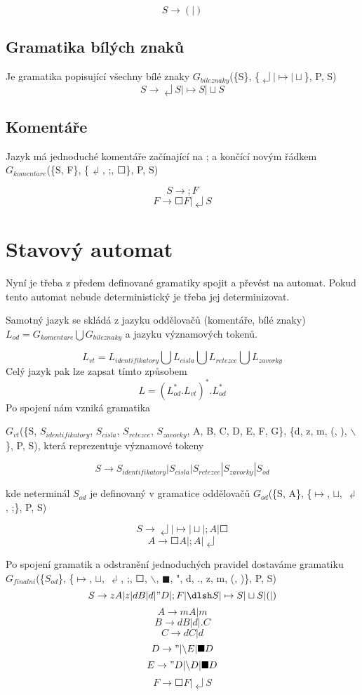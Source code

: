 \documentclass[a4paper,11pt]{article}
\begin{document}
$$S \rightarrow (|)$$

\subsection{Gramatika bílých znaků}
Je gramatika popisující všechny bílé znaky $G_{bileznaky}$(\{S\}, \{$\dlsh | \mapsto | \sqcup$\}, P, S)
$$S \rightarrow  \dlsh S | \mapsto S | \sqcup S$$

\subsection{Komentáře}
Jazyk má jednoduché komentáře začínající na ; a končící novým řádkem $G_{komentare}$(\{S, F\}, \{$\dlsh$, ;, $\Square$\}, P, S)

$$S \rightarrow ;F$$
$$F \rightarrow \Square F | \dlsh S$$

\section{Stavový automat}
Nyní je třeba z předem definované gramatiky spojit a převést na automat. Pokud tento automat nebude deterministický je třeba jej determinizovat.

Samotný jazyk se skládá z jazyku oddělovačů (komentáře, bílé znaky) $L_{od} = G_{komentare} \bigcup G_{bileznaky}$ a jazyku významových tokenů. 

$$L_{vt} = L_{identifikatory} \bigcup L_{cisla} \bigcup L_{retezce} \bigcup L_{zavorky}$$
Celý jazyk pak lze zapsat tímto způsobem 
$$L = (L^{*}_{od}.L_{vt})^{*}.L^{*}_{od}$$
Po spojení nám vzniká gramatika
 
$G_{vt}$(\{S, $S_{identifikatory}$, $S_{cisla}$, $S_{retezce}$, $S_{zavorky}$, A, B, C, D, E, F, G\}, \{d, z, m, (, ), $\backslash$ \}, P, S), která reprezentuje významové tokeny 

$$S \rightarrow S_{identifikatory} | S_{cisla} | S_{retezce} | S_{zavorky} | S_{od}$$

kde neterminál $S_{od}$ je definovaný v gramatice oddělovačů $G_{od}$(\{S, A\}, \{$\mapsto$, $\sqcup$, $\dlsh$, ;\}, P, S)

$$S \rightarrow \dlsh | \mapsto | \sqcup | ;A | \Square$$
$$A \rightarrow \Square A | ;A | \dlsh $$

Po spojení gramatik a odstranění jednoduchých pravidel dostaváme gramatiku
$G_{finalni}$(\{$S_{od}$\}, \{$\mapsto$, $\sqcup$, $\dlsh$, ;, $\Square$, $\backslash$, $\blacksquare$, ", d, ., z, m, (, )\}, P, S)
$$S \rightarrow zA | z | dB | d | "D | ;F | \dlsh S | \mapsto S | \sqcup S | ( | )$$
$$A \rightarrow mA | m$$
$$B \rightarrow dB | d | .C$$
$$C \rightarrow dC | d$$
$$D \rightarrow " | \backslash E | \blacksquare D$$
$$E \rightarrow "D | \backslash D | \blacksquare D$$
$$F \rightarrow \Square F | \dlsh S$$
\newpage
\end{document}
